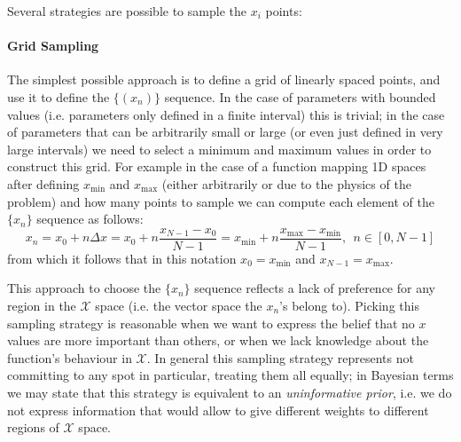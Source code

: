 Several strategies are possible to sample the $x_i$ points:
\paragraph{Grid Sampling}
The simplest possible approach is to define a grid of linearly spaced points, and use it to define the $\{(x_n)\}$ sequence. In the case of parameters with bounded values (i.e. parameters only defined in a finite interval) this is trivial; in the case of parameters that can be arbitrarily small or large (or even just defined in very large intervals) we need to select a minimum and maximum values in order to construct this grid. For example in the case of a function mapping 1D spaces after defining $x_{\text{min}}$ and $x_{\text{max}}$ (either arbitrarily or due to the physics of the problem) and how many points to sample we can compute each element of the $\{x_n\}$ sequence as follows:
\begin{equation*}
    x_n = x_0 + n\Delta x = x_0+n\frac{x_{N-1}-x_0}{N-1} = x_\text{min} + n\frac{x_{\text{max}}-x_{\text{min}}}{N-1}, \ \ n\in [0, N-1]
\end{equation*}
from which it follows that in this notation $x_0 = x_{\text{min}}$ and $ x_{N-1} = x_{\text{max}}$.

This approach to choose the $\{x_n\}$ sequence reflects a lack of preference for any region in the $\mathcal{X}$ space (i.e. the vector space the $x_n$'s belong to). Picking this sampling strategy is reasonable when we want to express the belief that no $x$ values are more important than others, or when we lack knowledge about the function's behaviour in $\mathcal{X}$. In general this sampling strategy represents not committing to any spot in particular, treating them all equally; in Bayesian terms we may state that this strategy is equivalent to an \emph{uninformative prior}, i.e. we do not express information that would allow to give different weights to different regions of $\mathcal{X}$ space.

